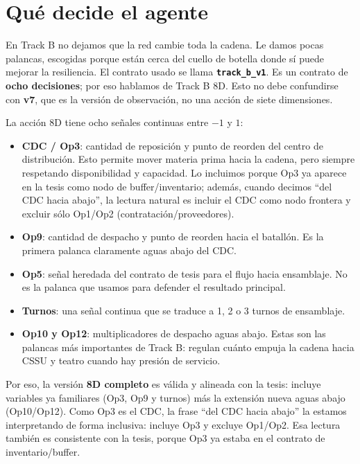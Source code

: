 \documentclass[11pt]{article}
\begin{document}
\section*{Qué decide el agente}

En Track B no dejamos que la red cambie toda la cadena. Le damos pocas palancas, escogidas porque
están cerca del cuello de botella donde sí puede mejorar la resiliencia. El contrato usado se llama
\textbf{\texttt{track\_b\_v1}}. Es un contrato de \textbf{ocho decisiones}; por eso hablamos de
Track B 8D. Esto no debe confundirse con \textbf{v7}, que es la versión de observación, no una
acción de siete dimensiones.

La acción 8D tiene ocho señales continuas entre $-1$ y $1$:

\begin{itemize}
  \item \textbf{CDC / Op3}: cantidad de reposición y punto de reorden del centro de distribución.
        Esto permite mover materia prima hacia la cadena, pero siempre respetando disponibilidad y
        capacidad. Lo incluimos porque Op3 ya aparece en la tesis como nodo de buffer/inventario;
        además, cuando decimos ``del CDC hacia abajo'', la lectura natural es incluir el CDC como
        nodo frontera y excluir sólo Op1/Op2 (contratación/proveedores).
  \item \textbf{Op9}: cantidad de despacho y punto de reorden hacia el batallón. Es la primera
        palanca claramente aguas abajo del CDC.
  \item \textbf{Op5}: señal heredada del contrato de tesis para el flujo hacia ensamblaje. No es la
        palanca que usamos para defender el resultado principal.
  \item \textbf{Turnos}: una señal continua que se traduce a 1, 2 o 3 turnos de ensamblaje.
  \item \textbf{Op10 y Op12}: multiplicadores de despacho aguas abajo. Estas son las palancas más
        importantes de Track B: regulan cuánto empuja la cadena hacia CSSU y teatro cuando hay
        presión de servicio.
\end{itemize}

Por eso, la versión \textbf{8D completo} es válida y alineada con la tesis: incluye variables ya
familiares (Op3, Op9 y turnos) más la extensión nueva aguas abajo (Op10/Op12). Como Op3 es el CDC,
la frase ``del CDC hacia abajo'' la estamos interpretando de forma inclusiva: incluye Op3 y excluye
Op1/Op2. Esa lectura también es consistente con la tesis, porque Op3 ya estaba en el contrato de
inventario/buffer.
\end{document}
